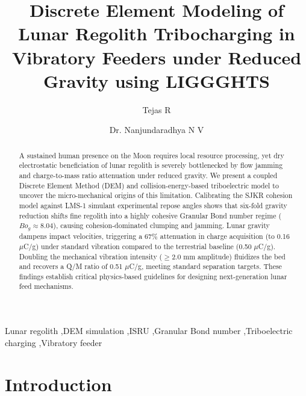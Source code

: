 \documentclass[preprint,12pt,authoryear]{elsarticle}
\begin{document}
\begin{frontmatter}

\title{Discrete Element Modeling of Lunar Regolith Tribocharging in Vibratory Feeders under Reduced Gravity using LIGGGHTS}

\author[1]{Tejas R}

\author[1]{Dr. Nanjundaradhya N V}


\begin{abstract}
A sustained human presence on the Moon requires local resource processing, yet dry electrostatic beneficiation of lunar regolith is severely bottlenecked by flow jamming and charge-to-mass ratio attenuation under reduced gravity. We present a coupled Discrete Element Method (DEM) and collision-energy-based triboelectric model to uncover the micro-mechanical origins of this limitation. Calibrating the SJKR cohesion model against LMS-1 simulant experimental repose angles shows that six-fold gravity reduction shifts fine regolith into a highly cohesive Granular Bond number regime ($Bo_g \approx 8.04$), causing cohesion-dominated clumping and jamming. Lunar gravity dampens impact velocities, triggering a 67\% attenuation in charge acquisition (to 0.16 $\mu$C/g) under standard vibration compared to the terrestrial baseline (0.50 $\mu$C/g). Doubling the mechanical vibration intensity ($\ge 2.0$ mm amplitude) fluidizes the bed and recovers a Q/M ratio of 0.51 $\mu$C/g, meeting standard separation targets. These findings establish critical physics-based guidelines for designing next-generation lunar feed mechanisms.
\end{abstract}


\begin{keyword}
Lunar regolith \sep DEM simulation \sep ISRU \sep Granular Bond number \sep Triboelectric charging \sep Vibratory feeder
\end{keyword}

\end{frontmatter}

\section{Introduction}
\label{sec:intro}
\end{document}
